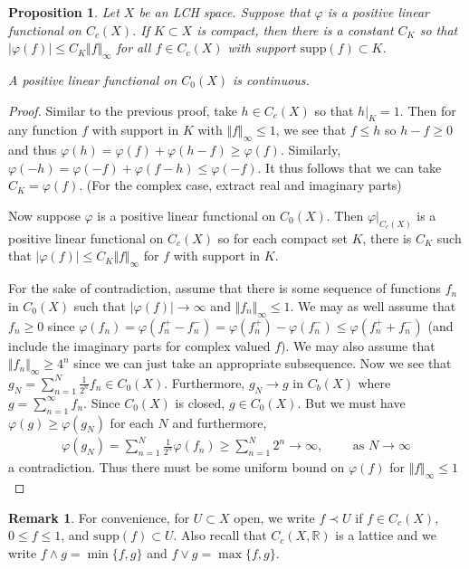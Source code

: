 \documentclass[11pt]{amsart}
\newtheorem{proposition}[theorem]{Proposition}
\theoremstyle{definition}
\newtheorem{remark}[theorem]{Remark}
\numberwithin{equation}{section}
\begin{document}
\begin{proposition}
    Let $X$ be an LCH space. Suppose that $\varphi$ is a positive linear functional on $C_c(X)$. If $K\subset X$ is compact, then there is a constant $C_K$ so that $|\varphi(f)|\le C_K\Vert f\Vert_\infty$ for all $f\in C_c(X)$ with support $\mathrm{supp}(f)\subset K$.

    A positive linear functional on $C_0(X)$ is continuous.
\end{proposition}
\begin{proof}
    Similar to the previous proof, take $h\in C_c(X)$ so that $h|_K=1$. Then for any function $f$ with support in $K$ with $\Vert f\Vert_\infty\le 1$, we see that $f\le h$ so $h-f\ge 0$ and thus $\varphi(h)=\varphi(f)+\varphi(h-f)\ge\varphi(f)$. Similarly, $\varphi(-h)=\varphi(-f)+\varphi(f-h)\le\varphi(-f)$. It thus follows that we can take $C_K=\varphi(f)$. (For the complex case, extract real and imaginary parts)

    Now suppose $\varphi$ is a positive linear functional on $C_0(X)$. Then $\varphi|_{C_c(X)}$ is a positive linear functional on $C_c(X)$ so for each compact set $K$, there is $C_K$ such that $|\varphi(f)|\le C_K\Vert f\Vert_\infty$ for $f$ with support in $K$.

    For the sake of contradiction, assume that there is some sequence of functions $f_n$ in $C_0(X)$ such that $|\varphi(f)|\to\infty$ and $\Vert f_n\Vert_\infty\le 1$. We may as well assume that $f_n\ge 0$ since $\varphi(f_n)=\varphi(f_n^+-f_n^-)=\varphi(f_n^+)-\varphi(f_n^-)\le\varphi(f_n^++f_n^-)$ (and include the imaginary parts for complex valued $f$). We may also assume that $\Vert f_n\Vert_\infty\ge 4^n$ since we can just take an appropriate subsequence. Now we see that $g_N=\sum_{n=1}^N\frac{1}{2^n}f_n\in C_0(X)$. Furthermore, $g_N\to g$ in $C_b(X)$ where $g=\sum_{n=1}^\infty f_n$. Since $C_0(X)$ is closed, $g\in C_0(X)$. But we must have $\varphi(g)\ge \varphi(g_N)$ for each $N$ and furthermore, 
    \begin{align*}
        \varphi(g_N)=\sum_{n=1}^N\frac{1}{2^n}\varphi(f_n)\ge\sum_{n=1}^N2^n\to\infty,\qquad \text{ as }N\to\infty
    \end{align*}
    a contradiction. Thus there must be some uniform bound on $\varphi(f)$ for $\Vert f\Vert_\infty\le 1$
\end{proof}
\begin{remark}
    For convenience, for $U\subset X$ open, we write $f\prec U$ if $f\in C_c(X)$, $0\le f\le 1$, and $\mathrm{supp}(f)\subset U$. Also recall that $C_c(X,\mathbb R)$ is a lattice and we write $f\land g=\min\{f,g\}$ and $f\lor g=\max\{f,g\}$.
\end{remark}
\end{document}
